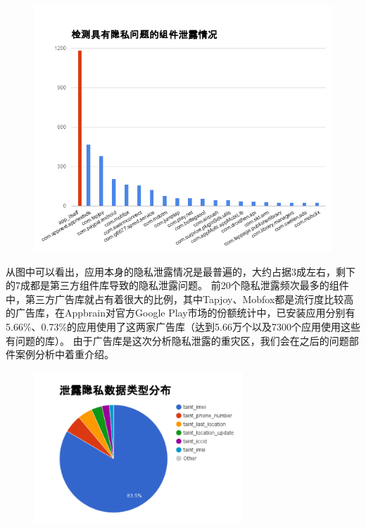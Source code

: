 \begin{figure}
	\centering
	\includegraphics[width=1\textwidth]{figure/leak-comp.png}
\end{figure}

从图中可以看出，应用本身的隐私泄露情况是最普遍的，大约占据3成左右，剩下的7成都是第三方组件库导致的隐私泄露问题。
前20个隐私泄露频次最多的组件中，第三方广告库就占有着很大的比例，其中Tapjoy、Mobfox都是流行度比较高的广告库，在Appbrain对官方Google Play市场的份额统计中，已安装应用分别有5.66\%、0.73\%的应用使用了这两家广告库（达到5.66万个以及7300个应用使用这些有问题的库）。
由于广告库是这次分析隐私泄露的重灾区，我们会在之后的问题部件案例分析中着重介绍。

\begin{figure}
	\centering
	\includegraphics[width=0.7\textwidth]{figure/leak-type.png}
\end{figure}

